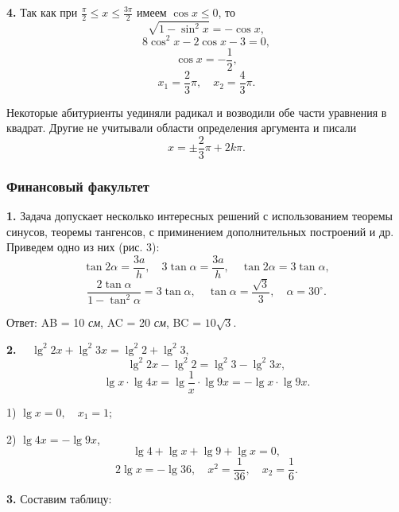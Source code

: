 \documentclass[a4paper, 14pt]{article}
\begin{document}
    \begin{doublespace}
        \textbf{4.} Так как при \(\frac{\pi}{2} \leq x \leq \frac{3\pi}{2}\) имеем \(\cos{x} \leq 0\), то
        \[\sqrt{1-\sin^2{x}}=-\cos{x},\]
        \[8\cos^2{x} - 2\cos{x} -3 =0,\]
        \[\cos{x}=-\frac{1}{2},\]
        \[x_1=\frac{2}{3}\pi,\quad x_2=\frac{4}{3}\pi.\]
    \end{doublespace}\par
    Некоторые абитуриенты уединяли радикал и возводили обе части уравнения в квадрат. Другие не учитывали области определения аргумента и писали
    \[x=\pm\frac{2}{3}\pi + 2k\pi.\]\par
    \begin{center}
    \subsubsection*{Финансовый факультет}
    \end{center}\par
    \textbf{1.} Задача допускает несколько интересных решений с использованием теоремы синусов, теоремы тангенсов, с приминением дополнительных построений и др. Приведем одно из них (рис. 3):
    \[\tan{2\alpha}=\frac{3a}{h},\quad 3\tan{\alpha}=\frac{3a}{h},\quad \tan{2\alpha}=3\tan{\alpha},\]
    \[\frac{2\tan{\alpha}}{1-\tan^2{\alpha}}=3\tan{\alpha}, \quad \tan{\alpha}=\frac{\sqrt{3}}{3}, \quad \alpha=30^\circ.\]\par
    Ответ: AB = 10 \textit{см}, AC = 20 \textit{см}, BC = \(10\sqrt{3}\). \par
    \begin{onehalfspace}
    \textbf{2. }
         \(\quad \lg^2{2x} + \lg^2{3x} = \lg^2{2} + \lg^2{3},\)
    \[\lg^2{2x} - \lg^2{2}= \lg^2{3} - \lg^2{3x},\]
    \[\lg{x} \cdot \lg{4x}=\lg{\frac{1}{x}} \cdot \lg{9x} = - \lg{x} \cdot \lg{9x}.\]\par
    1) \(\lg{x}=0, \quad x_1 = 1\); \par
    2) \(\lg{4x} = - \lg{9x}\),
    \[\lg{4} + \lg{x} + \lg{9} + \lg{x} = 0,\]
    \[2\lg{x} = -\lg{36}, \quad x^2 = \frac{1}{36}, \quad x_2 = \frac{1}{6}.\]\par
    \end{onehalfspace}
    \textbf{3. } Составим таблицу:\par
\end{document}
